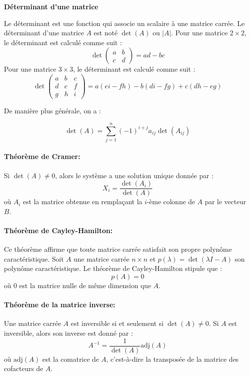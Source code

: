 \textbf{Déterminant d'une matrice}

Le déterminant est une fonction qui associe un scalaire à une matrice carrée. Le déterminant d'une matrice \(A\) est noté \(\det(A)\) ou \(|A|\). Pour une matrice \(2 \times 2\), le déterminant est calculé comme suit :
\[
\det\begin{pmatrix}
a & b \\
c & d
\end{pmatrix} = ad - bc
\]
Pour une matrice \(3 \times 3\), le déterminant est calculé comme suit :
\[
\det\begin{pmatrix}
a & b & c \\
d & e & f \\
g & h & i
\end{pmatrix} = a(ei - fh) - b(di - fg) + c(dh - eg)
\]

De manière plus générale, on a :


\[
\det(A) = \sum_{j=1}^{n} (-1)^{i+j} a_{ij} \det(A_{ij})
\]


\paragraph{Théorème de Cramer:}
Si \(\det(A) \neq 0\), alors le système a une solution unique donnée par :
\[
X_i = \frac{\det(A_i)}{\det(A)}
\]
où \(A_i\) est la matrice obtenue en remplaçant la \(i\)-ème colonne de \(A\) par le vecteur \(B\).

\paragraph{Théorème de Cayley-Hamilton:}
Ce théorème affirme que toute matrice carrée satisfait son propre polynôme caractéristique. Soit \(A\) une matrice carrée \(n \times n\) et \(p(\lambda) = \det(\lambda I - A)\) son polynôme caractéristique. Le théorème de Cayley-Hamilton stipule que :
\[
p(A) = 0
\]
où \(0\) est la matrice nulle de même dimension que \(A\).

\paragraph{Théorème de la matrice inverse:}
Une matrice carrée \(A\) est inversible si et seulement si \(\det(A) \neq 0\). Si \(A\) est inversible, alors son inverse est donné par :
\[
A^{-1} = \frac{1}{\det(A)} \text{adj}(A)
\]
où \(\text{adj}(A)\) est la comatrice de \(A\), c'est-à-dire la transposée de la matrice des cofacteurs de \(A\).



